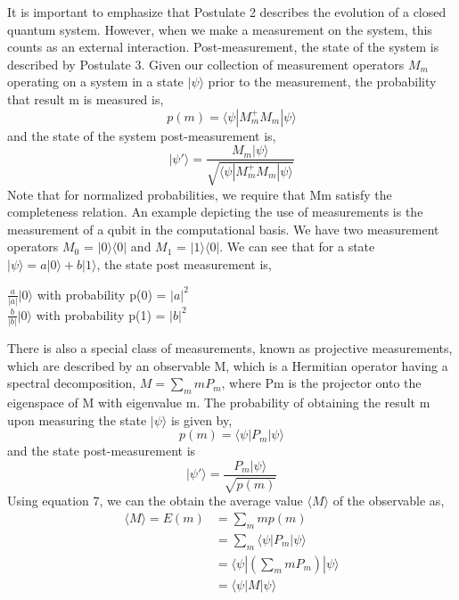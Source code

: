 \documentclass[20pt]{report}
\begin{document}
It is important to emphasize that Postulate 2 describes the evolution of a closed quantum system. However, when we make a measurement on the system, this counts as an external interaction. Post-measurement, the state of the system is described by Postulate 3. Given our collection of measurement operators $M_{m}$ operating on a system in a state $|\psi\rangle$ prior to the measurement, the probability that result m is measured is,
\begin{equation}
p(m) = \langle\psi|M_{m}^{+}M_{m}|\psi\rangle
\end{equation}
and the state of the system post-measurement is,
\begin{equation}
|\psi ' \rangle = \frac{M_{m} |\psi\rangle}{\sqrt{\langle\psi|M_{m}^{+}M_{m}|\psi\rangle}}
\end{equation}
Note that for normalized probabilities, we require that {Mm} satisfy the completeness relation. An example depicting the use of measurements is the measurement of a qubit in the computational basis. We have two measurement operators $M_{0}$ = $|0\rangle \langle0|$ and $M_{1}$ = $|1\rangle \langle0|$. We can see that for a state $|\psi\rangle = a |0\rangle + b |1\rangle$, the state post measurement is,
\begin{center}
$\frac{a}{|a|}|0\rangle$ with probability p(0) = $|a|^2$ \\
$\frac{b}{|b|}|0\rangle$ with probability p(1) = $|b|^2 $\\
\end{center}
There is also a special class of measurements, known as projective measurements, which are described
by an observable M, which is a Hermitian operator having a spectral decomposition,
$M = \sum_{m}mP_{m}$, where Pm is the projector onto the eigenspace of M with eigenvalue m. The probability of obtaining
the result m upon measuring the state $|\psi\rangle$ is given by,
\begin{equation}
p(m) = \langle\psi|P_{m}|\psi\rangle
\end{equation}
and the state post-measurement is
\begin{equation}
|\psi ' \rangle = \frac{P_{m}|\psi\rangle}{\sqrt{p(m)}}
\end{equation}
Using equation 7, we can the obtain the average value $\langle M \rangle$ of the observable as,
\begin{equation}
\begin{split}
\langle M \rangle = E(m)
& = \sum_{m}mp(m) \\
& = \sum_{m}\langle\psi|P_{m}|\psi\rangle \\
& = \langle\psi|(\sum_{m}mP_{m})|\psi\rangle \\
& = \langle\psi|M|\psi\rangle
\end{split}
\end{equation}

\printindex{}
\end{document}
